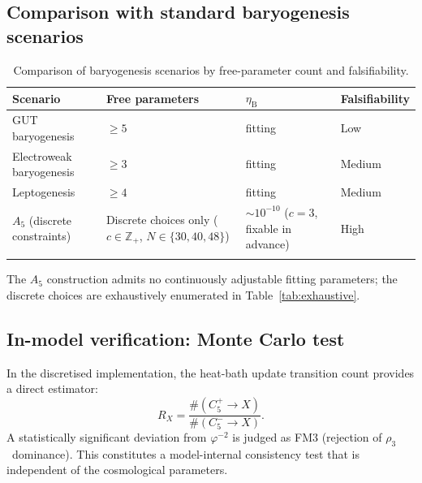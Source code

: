 \documentclass[sn-mathphys-num,Numbered]{sn-jnl}
\theoremstyle{thmstyleone}
\theoremstyle{thmstylethree}
\theoremstyle{thmstyletwo}
\newcommand{\etaB}{\eta_{\mathrm{B}}}
\begin{document}
\subsection{Comparison with standard baryogenesis scenarios}
\label{ssec:comparison-standard}

\begin{table}[h]
\caption{Comparison of baryogenesis scenarios by free-parameter count
and falsifiability.}
\label{tab:scenarios}
\begin{tabular}{@{}p{3.2cm}p{3.5cm}p{2.5cm}p{2.0cm}@{}}
\toprule
Scenario & Free parameters & $\etaB$ & Falsifiability \\
\midrule
GUT baryogenesis       & $\geq 5$ & fitting & Low \\
Electroweak baryogenesis & $\geq 3$ & fitting & Medium \\
Leptogenesis           & $\geq 4$ & fitting & Medium \\
$A_5$ (discrete constraints) &
  Discrete choices only
  ($c\in\mathbb{Z}_+$, $N\in\{30,40,48\}$) &
  ${\sim}10^{-10}$ ($c=3$, fixable in advance) &
  High \\
\botrule
\end{tabular}
\end{table}

The $A_5$ construction admits no continuously adjustable fitting
parameters; the discrete choices are exhaustively enumerated in
Table~\ref{tab:exhaustive}.

\subsection{In-model verification: Monte Carlo test}
\label{ssec:montecarlo}

In the discretised implementation, the heat-bath update transition count
provides a direct estimator:
\begin{equation}
  R_X = \frac{\#(C_5^+ \to X)}{\#(C_5^- \to X)}.
  \label{eq:RX-MC}
\end{equation}
A statistically significant deviation from $\varphi^{-2}$ is judged as
FM3 (rejection of $\rho_3$~dominance).  This constitutes a model-internal
consistency test that is independent of the cosmological parameters.
\end{document}
